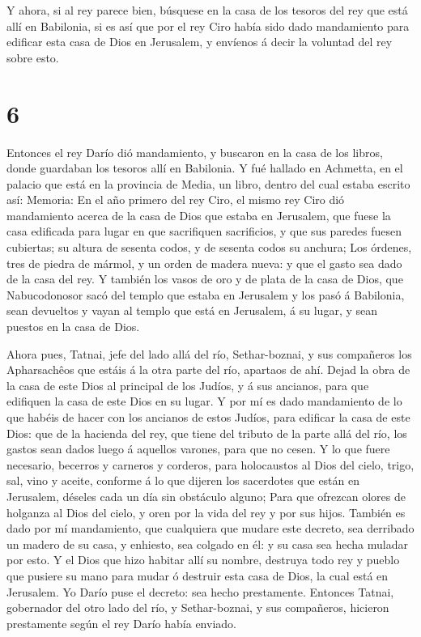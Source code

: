  Y ahora, si al rey parece bien, búsquese en la casa de los
tesoros del rey que está allí en Babilonia, si es así que por el rey
Ciro había sido dado mandamiento para edificar esta casa de Dios en
Jerusalem, y envíenos á decir la voluntad del rey sobre esto.

\hypertarget{section-5}{%
\section{6}\label{section-5}}

 Entonces el rey Darío dió mandamiento, y buscaron en la
casa de los libros, donde guardaban los tesoros allí en Babilonia.
 Y fué hallado en Achmetta, en el palacio que está en la
provincia de Media, un libro, dentro del cual estaba escrito así:
Memoria:  En el año primero del rey Ciro, el mismo rey Ciro
dió mandamiento acerca de la casa de Dios que estaba en Jerusalem, que
fuese la casa edificada para lugar en que sacrifiquen sacrificios, y que
sus paredes fuesen cubiertas; su altura de sesenta codos, y de sesenta
codos su anchura;  Los órdenes, tres de piedra de mármol, y
un orden de madera nueva: y que el gasto sea dado de la casa del rey.
 Y también los vasos de oro y de plata de la casa de Dios,
que Nabucodonosor sacó del templo que estaba en Jerusalem y los pasó á
Babilonia, sean devueltos y vayan al templo que está en Jerusalem, á su
lugar, y sean puestos en la casa de Dios.

 Ahora pues, Tatnai, jefe del lado allá del río,
Sethar-boznai, y sus compañeros los Apharsachêos que estáis á la otra
parte del río, apartaos de ahí.  Dejad la obra de la casa de
este Dios al principal de los Judíos, y á sus ancianos, para que
edifiquen la casa de este Dios en su lugar.  Y por mí es
dado mandamiento de lo que habéis de hacer con los ancianos de estos
Judíos, para edificar la casa de este Dios: que de la hacienda del rey,
que tiene del tributo de la parte allá del río, los gastos sean dados
luego á aquellos varones, para que no cesen.  Y lo que fuere
necesario, becerros y carneros y corderos, para holocaustos al Dios del
cielo, trigo, sal, vino y aceite, conforme á lo que dijeren los
sacerdotes que están en Jerusalem, déseles cada un día sin obstáculo
alguno;  Para que ofrezcan olores de holganza al Dios del
cielo, y oren por la vida del rey y por sus hijos.  También
es dado por mí mandamiento, que cualquiera que mudare este decreto, sea
derribado un madero de su casa, y enhiesto, sea colgado en él: y su casa
sea hecha muladar por esto.  Y el Dios que hizo habitar
allí su nombre, destruya todo rey y pueblo que pusiere su mano para
mudar ó destruir esta casa de Dios, la cual está en Jerusalem. Yo Darío
puse el decreto: sea hecho prestamente.  Entonces Tatnai,
gobernador del otro lado del río, y Sethar-boznai, y sus compañeros,
hicieron prestamente según el rey Darío había enviado.

